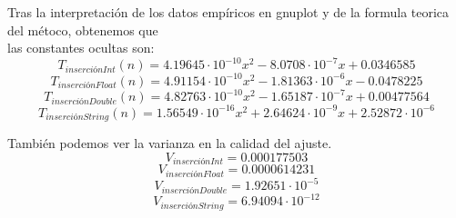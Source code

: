 \documentclass[11pt]{article}
\begin{document}
Tras la interpretación de los datos empíricos en gnuplot y de la formula teorica del métoco, obtenemos que \\
las constantes ocultas son:
\begin{equation*}
    T_{inserciónInt}(n)=4.19645 \cdot 10^{-10}x^{2}-8.0708 \cdot 10^{-7}x+0.0346585
\end{equation*}
\begin{equation*}
    T_{inserciónFloat}(n)=4.91154 \cdot 10^{-10}x^{2}-1.81363 \cdot 10^{-6}x-0.0478225 
\end{equation*}
\begin{equation*}
    T_{inserciónDouble}(n)=4.82763 \cdot 10^{-10}x^{2}-1.65187 \cdot 10^{-7}x+0.00477564 
\end{equation*}
\begin{equation*}
    T_{inserciónString}(n)=1.56549 \cdot 10^{-16}x^{2}+2.64624 \cdot 10^{-9}x+2.52872 \cdot 10^{-6}
\end{equation*}

También podemos ver la varianza en la calidad del ajuste. 
\begin{equation*}
    V_{inserciónInt}=0.000177503
\end{equation*}
\begin{equation*}
    V_{inserciónFloat}=0.0000614231
\end{equation*}
\begin{equation*}
    V_{inserciónDouble}=1.92651 \cdot 10^{-5}
\end{equation*}
\begin{equation*}
    V_{inserciónString}=6.94094\cdot 10^{-12}
\end{equation*}
\end{document}
